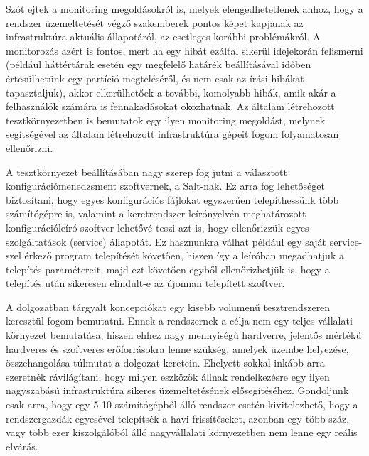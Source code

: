 Szót ejtek a monitoring megoldásokról is, melyek elengedhetetlenek ahhoz, hogy a rendszer üzemeltetését végző szakemberek pontos képet kapjanak az infrastruktúra aktuális állapotáról, az esetleges korábbi problémákról. A monitorozás azért is fontos, mert ha egy hibát ezáltal sikerül idejekorán felismerni (például háttértárak esetén egy megfelelő határék beállításával időben értesülhetünk egy partíció megteléséről, és nem csak az írási hibákat tapasztaljuk), akkor elkerülhetőek a további, komolyabb hibák, amik akár a felhasználók számára is fennakadásokat okozhatnak. Az általam létrehozott tesztkörnyezetben is bemutatok egy ilyen monitoring megoldást, melynek segítségével az általam létrehozott infrastruktúra gépeit fogom folyamatosan ellenőrizni.

A tesztkörnyezet beállításában nagy szerep fog jutni a választott konfigurációmenedzsment szoftvernek, a Salt-nak. Ez arra fog lehetőséget biztosítani, hogy egyes konfigurációs fájlokat egyszerűen telepíthessünk több számítógépre is, valamint a keretrendszer leírónyelvén meghatározott konfigurációleíró szoftver lehetővé teszi azt is, hogy ellenőrizzük egyes szolgáltatások (service) állapotát. Ez hasznunkra válhat például egy saját service-szel érkező program telepítését követően, hiszen így a leíróban megadhatjuk a telepítés paramétereit, majd ezt követően egyből ellenőrizhetjük is, hogy a telepítés után sikeresen elindult-e az újonnan telepített szoftver.


A dolgozatban tárgyalt koncepciókat egy kisebb volumenű tesztrendszeren keresztül fogom bemutatni. Ennek a rendszernek a célja nem egy teljes vállalati környezet bemutatása, hiszen ehhez nagy mennyiségű hardverre, jelentős mértékű hardveres és szoftveres erőforrásokra lenne szükség, amelyek üzembe helyezése, összehangolása túlmutat a dolgozat keretein.
Ehelyett sokkal inkább arra szeretnék rávilágítani, hogy milyen eszközök állnak rendelkezésre egy ilyen nagyszabású infrastruktúra sikeres üzemeltetésének elősegítéséhez. Gondoljunk csak arra, hogy egy 5-10 számítógépből álló rendszer esetén kivitelezhető, hogy a rendszergazdák egyesével telepítsék a havi frissítéseket, azonban egy több száz, vagy több ezer kiszolgálóból álló nagyvállalati környezetben nem lenne egy reális elvárás.

